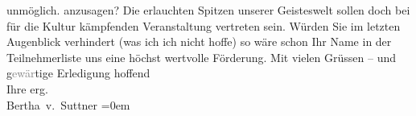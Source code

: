 \begin{ledgroupsized}[t]{13cm}
{{{                        unmöglich.}}}\label{K_L02179_1h} anzusagen? Die erlauchten Spitzen unserer Geisteswelt
                    sollen doch bei für die Kultur kämpfenden Veranstaltung
                    vertreten sein.\pend
           \pstart
           Würden Sie im letzten Augenblick verhindert (was ich ich nicht hoffe) so wäre
                    schon Ihr Name in der Teilnehmerliste uns eine höchst wertvolle Förderung.\pend
           \pstart
           Mit vielen Grüssen – und g\textcolor{gray}{ewär}tige Erledigung
                    hoffend{\\[\baselineskip]}Ihre erg.{\\[\baselineskip]}\spacefill\mbox{Bertha v. Suttner}\pend
           \leftskip=0em{}\endnumbering{}\end{ledgroupsized}  \newcommand{\dateiname}{L02179}\newcommand{\titel}{Bertha von Suttner an Arthur und Olga Schnitzler, 14. 5. 1914}\newcommand{\editorInnen}{Martin Anton Müller und Gerd-Hermann Susen}
            \footnotesize
\begin{ledgroupsized}[t]{11.5cm}
\end{ledgroupsized}
         
      